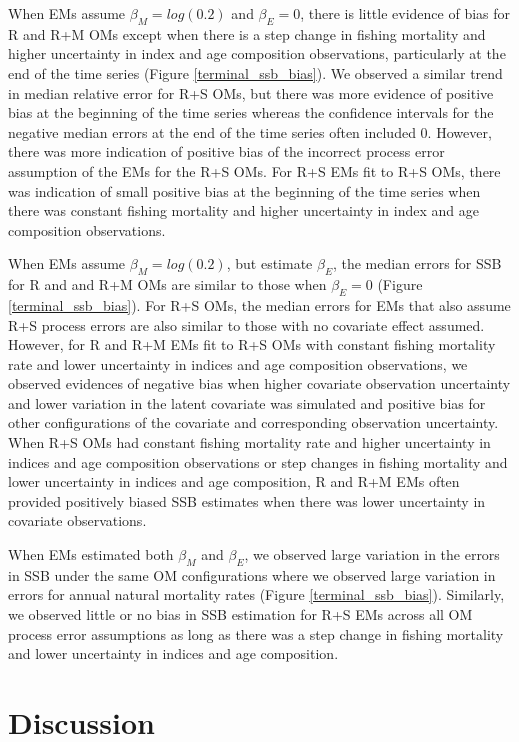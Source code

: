 \documentclass[
  12pt,
]{article}
\begin{document}
When EMs assume \(\beta_M = log(0.2)\) and \(\beta_E = 0\), there is little evidence of bias for R and R+M OMs except when there is a step change in fishing mortality and higher uncertainty in index and age composition observations, particularly at the end of the time series (Figure \ref{terminal_ssb_bias}). We observed a similar trend in median relative error for R+S OMs, but there was more evidence of positive bias at the beginning of the time series whereas the confidence intervals for the negative median errors at the end of the time series often included 0. However, there was more indication of positive bias of the incorrect process error assumption of the EMs for the R+S OMs. For R+S EMs fit to R+S OMs, there was indication of small positive bias at the beginning of the time series when there was constant fishing mortality and higher uncertainty in index and age composition observations.

When EMs assume \(\beta_M = log(0.2)\), but estimate \(\beta_E\), the median errors for SSB for R and and R+M OMs are similar to those when \(\beta_E = 0\) (Figure \ref{terminal_ssb_bias}). For R+S OMs, the median errors for EMs that also assume R+S process errors are also similar to those with no covariate effect assumed. However, for R and R+M EMs fit to R+S OMs with constant fishing mortality rate and lower uncertainty in indices and age composition observations, we observed evidences of negative bias when higher covariate observation uncertainty and lower variation in the latent covariate was simulated and positive bias for other configurations of the covariate and corresponding observation uncertainty. When R+S OMs had constant fishing mortality rate and higher uncertainty in indices and age composition observations or step changes in fishing mortality and lower uncertainty in indices and age composition, R and R+M EMs often provided positively biased SSB estimates when there was lower uncertainty in covariate observations.

When EMs estimated both \(\beta_M\) and \(\beta_E\), we observed large variation in the errors in SSB under the same OM configurations where we observed large variation in errors for annual natural mortality rates (Figure \ref{terminal_ssb_bias}). Similarly, we observed little or no bias in SSB estimation for R+S EMs across all OM process error assumptions as long as there was a step change in fishing mortality and lower uncertainty in indices and age composition.

\hypertarget{discussion}{%
\section*{Discussion}\label{discussion}}
\end{document}
